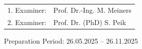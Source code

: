 \begin{titlepage}
\begin{center}
\begin{tabular}{rl}
1. Examiner: & Prof. Dr.-Ing. M. Meiners \\
2. Examiner: & Prof. Dr. (PhD) S. Peik \\
\end{tabular}

\vspace{1cm}

{\large Preparation Period: 26.05.2025 -- 26.11.2025}

\end{center}
\end{titlepage}

